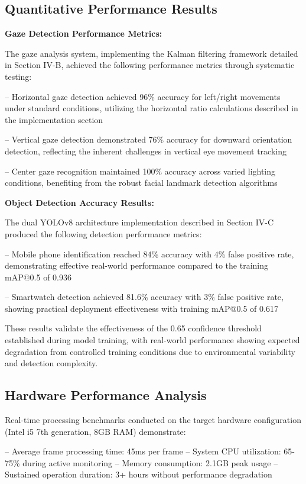 \documentclass[conference]{IEEEtran}
\begin{document}
\subsection{Quantitative Performance Results}

\textbf{Gaze Detection Performance Metrics:}

The gaze analysis system, implementing the Kalman filtering framework detailed in Section IV-B, 
achieved the following performance metrics through systematic testing:

-- Horizontal gaze detection achieved 96\% accuracy for left/right movements under 
standard conditions, utilizing the horizontal ratio calculations described in the 
implementation section

-- Vertical gaze detection demonstrated 76\% accuracy for downward orientation 
detection, reflecting the inherent challenges in vertical eye movement tracking

-- Center gaze recognition maintained 100\% accuracy across varied lighting 
conditions, benefiting from the robust facial landmark detection algorithms

\textbf{Object Detection Accuracy Results:}

The dual YOLOv8 architecture implementation described in Section IV-C produced 
the following detection performance metrics:

-- Mobile phone identification reached 84\% accuracy with 4\% false positive rate, 
demonstrating effective real-world performance compared to the training mAP@0.5 of 0.936

-- Smartwatch detection achieved 81.6\% accuracy with 3\% false positive rate, 
showing practical deployment effectiveness with training mAP@0.5 of 0.617

These results validate the effectiveness of the 0.65 confidence threshold established 
during model training, with real-world performance showing expected degradation from 
controlled training conditions due to environmental variability and detection complexity.

\subsection{Hardware Performance Analysis}

Real-time processing benchmarks conducted on the target hardware configuration 
(Intel i5 7th generation, 8GB RAM) demonstrate:

-- Average frame processing time: 45ms per frame
-- System CPU utilization: 65-75\% during active monitoring
-- Memory consumption: 2.1GB peak usage
-- Sustained operation duration: 3+ hours without performance degradation
\end{document}
